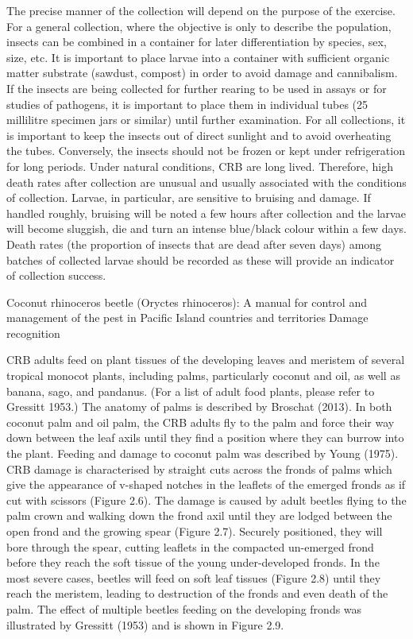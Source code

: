\documentclass[twocolumn,letterpaper]{scrartcl}
\begin{document}
The precise manner of the collection will depend on the purpose of the exercise. For a general collection, where 
the objective is only to describe the population, insects can be combined in a container for later differentiation 
by species, sex, size, etc. It is important to place larvae into a container with sufficient organic matter substrate 
(sawdust, compost) in order to avoid damage and cannibalism. If the insects are being collected for further 
rearing to be used in assays or for studies of pathogens, it is important to place them in individual tubes (25 
millilitre specimen jars or similar) until further examination. For all collections, it is important to keep the insects 
out of direct sunlight and to avoid overheating the tubes. Conversely, the insects should not be frozen or kept 
under refrigeration for long periods. Under natural conditions, CRB are long lived. Therefore, high death rates 
after collection are unusual and usually associated with the conditions of collection. Larvae, in particular, are 
sensitive to bruising and damage. If handled roughly, bruising will be noted a few hours after collection and 
the larvae will become sluggish, die and turn an intense blue/black colour within a few days. Death rates (the 
proportion of insects that are dead after seven days) among batches of collected larvae should be recorded as 
these will provide an indicator of collection success.

Coconut rhinoceros beetle (Oryctes rhinoceros): A manual for control and management of the pest in Pacific Island countries and territoriesDamage recognition 

CRB adults feed on plant tissues of the developing leaves and meristem of several tropical monocot plants, 
including palms, particularly coconut and oil, as well as banana, sago, and pandanus. (For a list of adult food 
plants, please refer to Gressitt 1953.) The anatomy of palms is described by Broschat (2013). In both coconut 
palm and oil palm, the CRB adults fly to the palm and force their way down between the leaf axils until they find 
a position where they can burrow into the plant. Feeding and damage to coconut palm was described by Young 
(1975). CRB damage is characterised by straight cuts across the fronds of palms which give the appearance of 
v-shaped notches in the leaflets of the emerged fronds as if cut with scissors (Figure 2.6). The damage is caused 
by adult beetles flying to the palm crown and walking down the frond axil until they are lodged between the 
open frond and the growing spear (Figure 2.7). Securely positioned, they will bore through the spear, cutting 
leaflets in the compacted un-emerged frond before they reach the soft tissue of the young under-developed 
fronds. In the most severe cases, beetles will feed on soft leaf tissues (Figure 2.8) until they reach the meristem, 
leading to destruction of the fronds and even death of the palm. The effect of multiple beetles feeding on the 
developing fronds was illustrated by Gressitt (1953) and is shown in Figure 2.9. 
\end{document}
